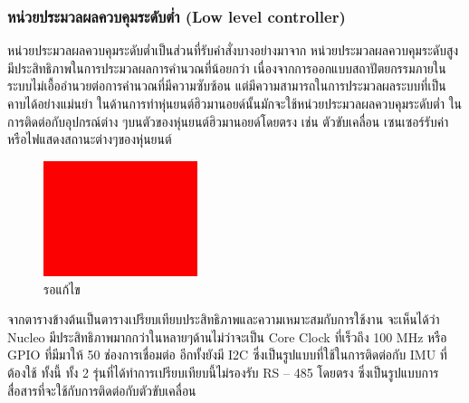 \subsubsection*{หน่วยประมวลผลควบคุมระดับต่ำ (Low level controller)}
หน่วยประมวลผลควบคุมระดับต่ำเป็นส่วนที่รับคำสั่งบางอย่างมาจาก หน่วยประมวลผลควบคุมระดับสูง
มีประสิทธิภาพในการประมวลผลการคำนวณที่น้อยกว่า เนื่องจากการออกแบบสถาปัตยกรรมภายในระบบไม่เอื้ออำนวยต่อการคำนวณที่มีความซับซ้อน
แต่มีความสามารถในการประมวลผลระบบที่เป็นคาบได้อย่างแม่นยำ ในด้านการทำหุ่นยนต์ฮิวมานอยด์นั้นมักจะใช้หน่วยประมวลผลควบคุมระดับต่ำ
ในการติดต่อกับอุปกรณ์ต่าง ๆบนตัวของหุ่นยนต์ฮิวมานอยด์โดยตรง เช่น ตัวขับเคลื่อน เซนเซอร์รับค่า หรือไฟแสดงสถานะต่างๆของหุ่นยนต์
\begin{figure}[ht]
    \centering
    \includegraphics[width=0.40\textwidth]{chapter2/images/toedit.jpg}
    \caption{รอแก้ไข}
    \label{fig:toedit}
\end{figure}
จากตารางข้างต้นเป็นตารางเปรียบเทียบประสิทธิภาพและความเหมาะสมกับการใช้งาน จะเห็นได้ว่า Nucleo
มีประสิทธิภาพมากกว่าในหลายๆด้านไม่ว่าจะเป็น Core Clock ที่เร็วถึง 100 MHz หรือ GPIO ที่มีมาให้ 50
ช่องการเชื่อมต่อ อีกทั้งยังมี I2C ซึ่งเป็นรูปแบบที่ใช้ในการติดต่อกับ IMU ที่ต้องใช้ ทั้งนี้ ทั้ง 2
รุ่นที่ได้ทำการเปรียบเทียบนี้ไม่รองรับ RS – 485 โดยตรง ซึ่งเป็นรูปแบบการสื่อสารที่จะใช้กับการติดต่อกับตัวขับเคลื่อน

\clearpage
